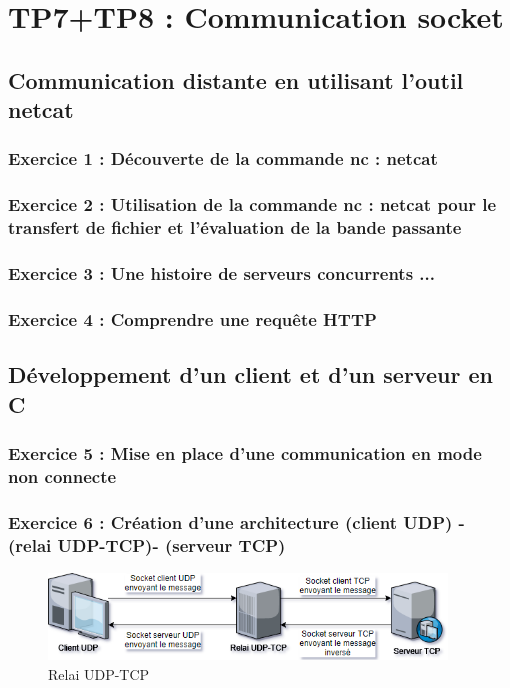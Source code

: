 \chapter{TP7+TP8 : Communication socket}

\section{Communication distante en utilisant l’outil netcat}

\subsection{Exercice 1 : Découverte de la commande nc : netcat}

\subsection{Exercice 2 : Utilisation de la commande nc : netcat pour le transfert de fichier et l’évaluation de la bande passante}

\subsection{Exercice 3 : Une histoire de serveurs concurrents ...}

\subsection{Exercice 4 : Comprendre une requête HTTP}

\section{Développement d’un client et d’un serveur en C}

\subsection{Exercice 5 : Mise en place d’une communication en mode non connecte}

\subsection{Exercice 6 : Création d’une architecture (client UDP) - (relai UDP-TCP)- (serveur TCP)}

\begin{figure}[H]
\centering
\includegraphics[width=300pt]{./cpp/Pictures/tp7+tp8-relay-UDP-TCP}
\caption{Relai UDP-TCP}
\label{Relai UDP-TCP}
\end{figure}

